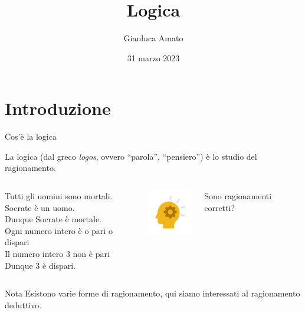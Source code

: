\documentclass[aspectratio=169,10pt]{beamer}
\title{Logica}
\author{Gianluca Amato}
\date{31 marzo 2023}
\begin{document}
\begin{frame}
    \titlepage
\end{frame}


\section{Introduzione}

\begin{frame}{Cos'è la logica}
    \begin{definition}[Logica]
        La \alert{logica} (dal greco \textit{logos}, ovvero ``parola'', ``pensiero'') è lo studio del ragionamento.
    \end{definition}
    \begin{example}
        \begin{columns}
            \begin{center}
            Tutti gli uomini sono mortali.\\
            Socrate è un uomo.\\
            Dunque Socrate è mortale.\\[0.6cm]
            Ogni numero intero è o pari o dispari\\
            Il numero intero 3 non è pari\\
            Dunque 3 è dispari.
            \end{center}
            \centering
            \includegraphics[width=2cm,keepaspectratio]{logica.png}

            \alert{Sono ragionamenti corretti?}
        \end{columns}
    \end{example}
    \begin{block}{Nota}
    Esistono varie forme di ragionamento, qui siamo interessati al \alert{ragionamento deduttivo}.
    \end{block}
\end{frame}
\end{document}
